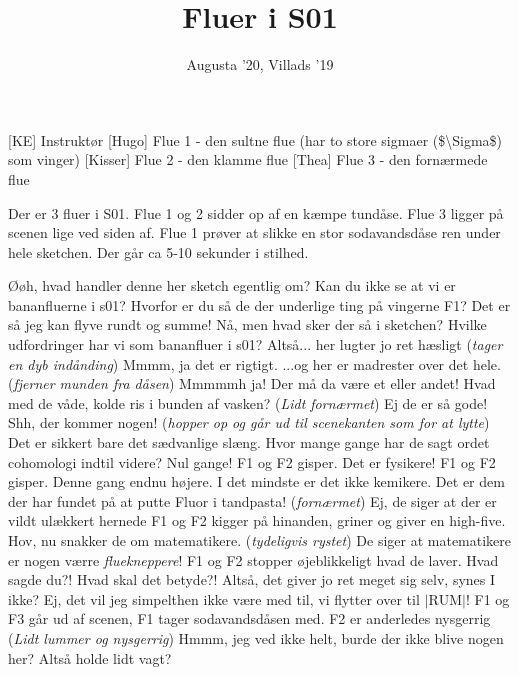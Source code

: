 \documentclass[a4paper,11pt]{article}
\title{Fluer i S01}
\author{Augusta '20, Villads '19}
\begin{document}
\maketitle

\begin{roles}
[KE] Instruktør
[Hugo] Flue 1 - den sultne flue (har to store sigmaer (\$\textbackslash{}Sigma\$) som vinger)
[Kisser] Flue 2 - den klamme flue
[Thea] Flue 3 - den fornærmede flue
\end{roles}

\begin{sketch}
\scene Der er 3 fluer i S01. Flue 1 og 2 sidder op af en kæmpe tundåse. Flue 3 ligger på scenen lige ved siden af. Flue 1 prøver at slikke en stor sodavandsdåse ren under hele sketchen. Der går ca 5-10 sekunder i stilhed.

 Øøh, hvad handler denne her sketch egentlig om? 
 Kan du ikke se at vi er bananfluerne i s01?
 Hvorfor er du så de der underlige ting på vingerne F1?
 Det er så jeg kan flyve rundt og summe!
 Nå, men hvad sker der så i sketchen? Hvilke udfordringer har vi som bananfluer i s01? 
 Altså... her lugter jo ret hæsligt
 (\textit{tager en dyb indånding}) Mmmm, ja det er rigtigt.
 ...og her er madrester over det hele.
 (\textit{fjerner munden fra dåsen}) Mmmmmh ja! 
 Der må da være et eller andet! Hvad med de våde, kolde ris i bunden af vasken? 
 (\textit{Lidt fornærmet}) Ej de er så gode! 
 Shh, der kommer nogen! (\textit{hopper op og går ud til scenekanten som for at lytte})
 Det er sikkert bare det sædvanlige slæng. Hvor mange gange har de sagt ordet cohomologi indtil videre?
 Nul gange!
\scene F1 og F2 gisper.
 Det er fysikere!
\scene F1 og F2 gisper. Denne gang endnu højere.
 I det mindste er det ikke kemikere. Det er dem der har fundet på at putte Fluor i tandpasta! 
 (\textit{fornærmet}) Ej, de siger at der er vildt ulækkert hernede
\scene F1 og F2 kigger på hinanden, griner og giver en high-five.
 Hov, nu snakker de om matematikere. (\textit{tydeligvis rystet}) De siger at matematikere er nogen værre \textit{fluekneppere}!
\scene F1 og F2 stopper øjeblikkeligt hvad de laver.
 Hvad sagde du?! Hvad skal det betyde?!
 Altså, det giver jo ret meget sig selv, synes I ikke?
 Ej, det vil jeg simpelthen ikke være med til, vi flytter over til $|\text{RUM}|!$
\scene F1 og F3 går ud af scenen, F1 tager sodavandsdåsen med. F2 er anderledes nysgerrig
 (\textit{Lidt lummer og nysgerrig}) Hmmm, jeg ved ikke helt, burde der ikke blive nogen her? Altså holde lidt vagt?
\end{sketch}
\end{document}
